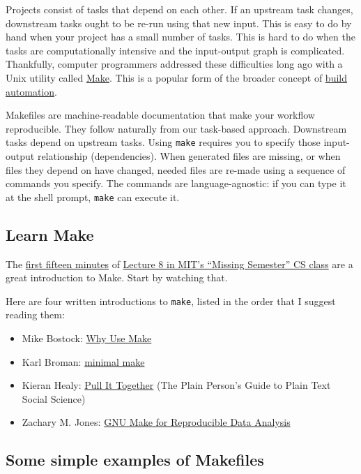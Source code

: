 Projects consist of tasks that depend on each other.
If an upstream task changes, downstream tasks ought to be re-run using that new input.
This is easy to do by hand when your project has a small number of tasks.
This is hard to do when the tasks are computationally intensive and the input-output graph is complicated.
Thankfully, computer programmers addressed these difficulties long ago with a Unix utility called \href{https://en.wikipedia.org/wiki/Make_(software)}{Make}.
This is a popular form of the broader concept of \href{https://tradediversion.net/2019/11/06/why-your-research-project-needs-build-automation/}{build automation}.

Makefiles are machine-readable documentation that make your workflow reproducible.
They follow naturally from our task-based approach.
Downstream tasks depend on upstream tasks.
Using \texttt{make} requires you to specify those input-output relationship (dependencies).
When generated files are missing, or when files they depend on have changed, needed files are re-made using a sequence of commands you specify.
The commands are language-agnostic: if you can type it at the shell prompt,
\texttt{make} can execute it.

\subsection{Learn Make}

The \href{https://www.youtube.com/watch?v=_Ms1Z4xfqv4}{first fifteen minutes} of
\href{https://missing.csail.mit.edu/2020/metaprogramming/}{Lecture 8 in MIT's ``Missing Semester'' CS class}
are a great introduction to Make.
Start by watching that.

Here are four written introductions to \texttt{make}, listed in the order that I suggest reading them:
\begin{itemize}
\item Mike Bostock: \href{https://bost.ocks.org/mike/make/}{Why Use Make}
\item Karl Broman: \href{http://kbroman.org/minimal_make/}{minimal make}
\item Kieran Healy: \href{http://plain-text.co/pull-it-together.html}{Pull It Together} (The Plain Person's Guide to Plain Text Social Science)
\item Zachary M. Jones: \href{http://zmjones.com/make/}{GNU Make for Reproducible Data Analysis}
\end{itemize}

\subsection{Some simple examples of Makefiles}
\label{some_simple_examples_of_makefiles}

